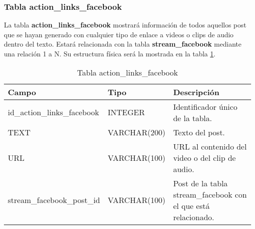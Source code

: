 \subsubsection{Tabla action\_links\_facebook}
La tabla \textbf{action\_links\_facebook} mostrará información de todos aquellos post que se hayan generado con cualquier tipo de enlace a videos o clips de audio dentro del texto. Estará relacionada con la tabla \textbf{stream\_facebook} mediante una relación 1 a N. Su estructura física será la mostrada en la tabla \ref{tabActionLinksFacebook}.
\bigskip
\par
\begin{table}[h]
\begin{center}
\begin{tabular}{| l | l | p{60mm} |}\hline
\textbf{Campo}&\textbf{Tipo}&\textbf{Descripción} \\ \hline
id\_action\_links\_facebook & INTEGER & Identificador único de la tabla. \\ \hline
TEXT & VARCHAR(200) & Texto del post. \\ \hline
URL & VARCHAR(100) & URL al contenido del video o del clip de audio. \\ \hline
stream\_facebook\_post\_id & VARCHAR(100) & Post de la tabla stream\_facebook con el que está relacionado. \\ \hline
\end{tabular}
\end{center}
\caption{Tabla action\_links\_facebook} \label{tabActionLinksFacebook}
\end{table}

